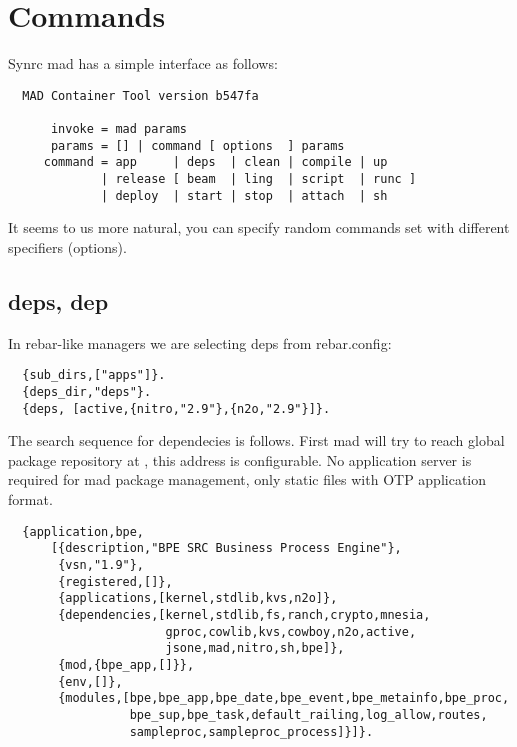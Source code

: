 \section{Commands}

Synrc mad has a simple interface as follows:

\vspace{1\baselineskip}
\begin{lstlisting}
  MAD Container Tool version b547fa

      invoke = mad params
      params = [] | command [ options  ] params
     command = app     | deps  | clean | compile | up
             | release [ beam  | ling  | script  | runc ]
             | deploy  | start | stop  | attach  | sh
\end{lstlisting}
\vspace{1\baselineskip}

It seems to us more natural, you can specify random
commands set with different specifiers (options).

\subsection{deps, dep}

In rebar-like managers we are selecting deps from rebar.config:
\vspace{1\baselineskip}
\begin{lstlisting}
  {sub_dirs,["apps"]}.
  {deps_dir,"deps"}.
  {deps, [active,{nitro,"2.9"},{n2o,"2.9"}]}.
\end{lstlisting}
\vspace{1\baselineskip}

The search sequence for dependecies is follows. First mad will try to
reach global package repository at ,
this address is configurable. No application server is required for mad
package management, only static files with OTP application format.

\vspace{1\baselineskip}
\begin{lstlisting}
  {application,bpe,
      [{description,"BPE SRC Business Process Engine"},
       {vsn,"1.9"},
       {registered,[]},
       {applications,[kernel,stdlib,kvs,n2o]},
       {dependencies,[kernel,stdlib,fs,ranch,crypto,mnesia,
                      gproc,cowlib,kvs,cowboy,n2o,active,
                      jsone,mad,nitro,sh,bpe]},
       {mod,{bpe_app,[]}},
       {env,[]},
       {modules,[bpe,bpe_app,bpe_date,bpe_event,bpe_metainfo,bpe_proc,
                 bpe_sup,bpe_task,default_railing,log_allow,routes,
                 sampleproc,sampleproc_process]}]}.
\end{lstlisting}
\vspace{1\baselineskip}

